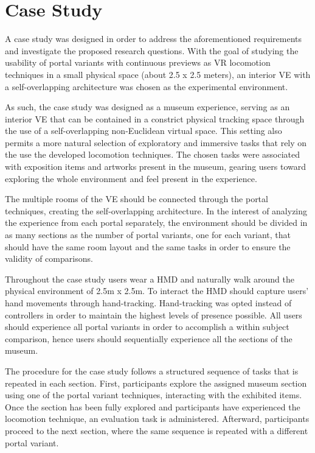 \section{Case Study}
\label{sec:case-study}

A case study was designed in order to address the aforementioned requirements and investigate the proposed research questions. 
With the goal of studying the usability of portal variants with continuous previews as \gls{VR} locomotion techniques in a small 
physical space (about 2.5 x 2.5 meters), an interior \gls{VE} with a self-overlapping architecture was chosen as the experimental 
environment.

As such, the case study was designed as a museum experience, serving as an interior \gls{VE} that can be contained in a constrict physical tracking 
space through the use of a self-overlapping non-Euclidean virtual space. This setting also permits a more natural selection of exploratory  and 
immersive tasks that rely on the use the developed locomotion techniques. The chosen tasks were associated with exposition items and artworks 
present in the museum, gearing users toward exploring the whole environment and feel present in the experience.

The multiple rooms of the \gls{VE} should be connected through the portal techniques, creating the self-overlapping architecture. In the interest 
of analyzing the experience from each portal separately, the environment should be divided in as many sections as the number of portal variants, one 
for each variant, that should have the same room layout and the same tasks in order to ensure the validity of comparisons.

Throughout the case study users wear a \gls{HMD} and naturally walk around the physical environment of 2.5m x 2.5m. To interact the \gls{HMD} 
should capture users' hand movements through hand-tracking. Hand-tracking was opted instead of controllers in order to maintain the highest levels 
of presence possible. All users should experience all portal variants in order to accomplish a within subject comparison, hence users should 
sequentially experience all the sections of the museum.

The procedure for the case study follows a structured sequence of tasks that is repeated in each section. 
First, participants explore the assigned museum section using one of the portal variant techniques, interacting with the exhibited items. 
Once the section has been fully explored and participants have experienced the locomotion technique, an evaluation task is administered.
Afterward, participants proceed to the next section, where the same sequence is repeated with a different portal variant.

